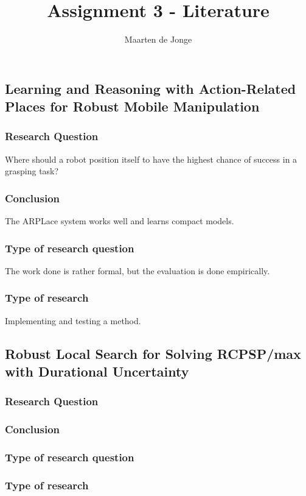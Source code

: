 \documentclass[a4paper, 10pt]{article}
\author{Maarten de Jonge}
\title{Assignment 3 - Literature}
\begin{document}
\maketitle

\section{}
\subsection{Learning and Reasoning with Action-Related Places for Robust Mobile Manipulation}
\subsubsection*{Research Question}
Where should a robot position itself to have the highest chance of success in a
grasping task?
\subsubsection*{Conclusion}
The ARPLace system works well and learns compact models.
\subsubsection*{Type of research question}
The work done is rather formal, but the evaluation is done empirically.
\subsubsection*{Type of research}
Implementing and testing a method.

\subsection{Robust Local Search for Solving RCPSP/max with Durational Uncertainty}
\subsubsection*{Research Question}
\subsubsection*{Conclusion}
\subsubsection*{Type of research question}
\subsubsection*{Type of research}
\end{document}
